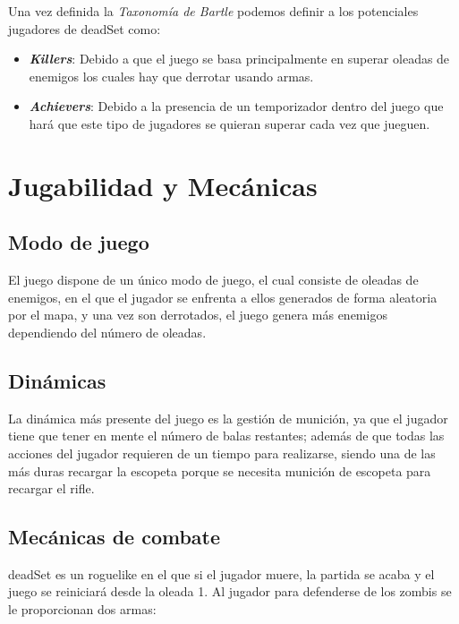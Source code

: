 \documentclass[11pt]{article}
\begin{document}
            \vspace{5mm}
    
            Una vez definida la \textit{Taxonomía de Bartle} \cite{bartle} podemos definir a los potenciales jugadores de \textunderscore deadSet como: 
                \begin{itemize}
                    \item \textit{\textbf{Killers}}: Debido a que el juego se basa principalmente en superar oleadas de enemigos los cuales hay que derrotar usando armas.
                    \item \textit{\textbf{Achievers}}: Debido a la presencia de un temporizador dentro del juego que hará que este tipo de jugadores se quieran superar cada vez que jueguen.
                \end{itemize}


\section{Jugabilidad y Mecánicas}
    \subsection{Modo de juego}
        El juego dispone de un único modo de juego, el cual consiste de oleadas de enemigos, en el que el jugador se enfrenta a ellos generados de forma aleatoria por el mapa, y una vez son derrotados, el juego genera más enemigos dependiendo del número de oleadas.\\

    \subsection{Dinámicas}
        La dinámica más presente del juego es la gestión de munición, ya que el jugador tiene que tener en mente el número de balas restantes; además de que todas las acciones del jugador requieren de un tiempo para realizarse, siendo una de las más duras recargar la escopeta porque se necesita munición de escopeta para recargar el rifle. \\
    
    \subsection{Mecánicas de combate}
        \textunderscore deadSet es un roguelike en el que si el jugador muere, la partida se acaba y el juego se reiniciará desde la oleada 1. Al jugador para defenderse de los zombis se le proporcionan dos armas:
        
\end{document}
